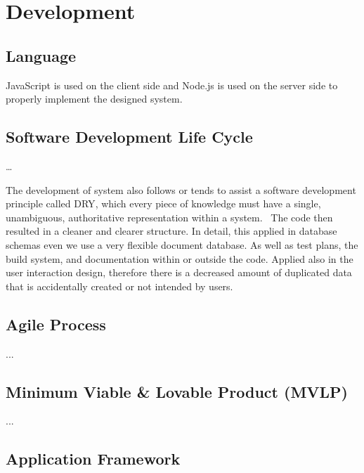 \section{Development}
\label{sec:development}

\subsection{Language}

JavaScript is used on the client side and Node.js is used on the server side to properly implement the designed system.

\subsection{Software Development Life Cycle}

\ldots

The development of system also follows or tends to assist a software development principle called \ac{DRY},
which every piece of knowledge must have a single, unambiguous, authoritative representation within a system.~\autocite{Hunt1999Pragmatic}
The code then resulted in a cleaner and clearer structure.
In detail, this applied in database schemas even we use a very flexible document database.
As well as test plans, the build system, and documentation within or outside the code.
Applied also in the user interaction design, therefore there is a decreased amount of duplicated data that is accidentally created or not intended by users.

\subsection{Agile Process}

...

\subsection{Minimum Viable \& Lovable Product (MVLP)}

...

\subsection{Application Framework}

